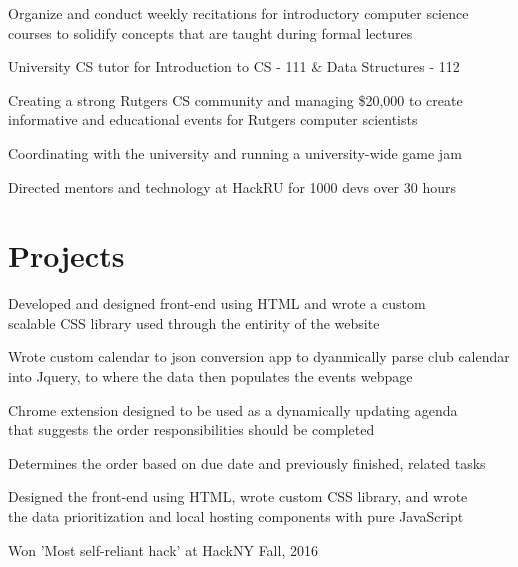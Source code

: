 \documentclass[]{deedy-resume-openfont}
\begin{document}
\begin{minipage}[t]{0.66\textwidth}
\begin{tightemize}
\item Organize and conduct weekly recitations for introductory computer science courses to solidify concepts that are taught during formal lectures
\item University CS tutor for Introduction to CS - 111 \& Data Structures - 112
\end{tightemize}
\sectionsep

\begin{tightemize}
\item Creating a strong Rutgers CS community and managing \$20,000 to create informative and educational events for Rutgers computer scientists
\item Coordinating with the university and running a university-wide  game jam
\item Directed mentors and technology at HackRU for 1000 devs over 30 hours
\end{tightemize}
\sectionsep


\section{Projects}
\begin{tightemize}
\item Developed and designed front-end using HTML and wrote a custom\\ scalable CSS library used through the entirity of the website 
\item Wrote custom calendar to json conversion app to dyanmically parse club calendar into Jquery, to where the data then populates the events webpage 
\end{tightemize}
\sectionsep

\begin{tightemize}
\item Chrome extension designed to be used as a dynamically updating agenda \\that suggests the order responsibilities should be completed 
\item Determines the order based on due date and previously finished, related tasks
\item Designed the front-end using HTML, wrote custom CSS library, and wrote \\the data prioritization and local hosting components with pure JavaScript 
\item Won 'Most self-reliant hack' at HackNY Fall, 2016
\end{tightemize}
\sectionsep


\end{minipage}
\end{document}

